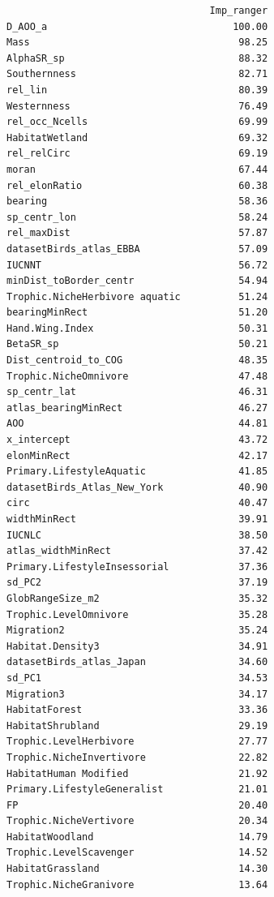\documentclass[
  letterpaper,
  DIV=11,
  numbers=noendperiod]{scrreprt}
\begin{document}
\begin{verbatim}
                                   Imp_ranger
D_AOO_a                                100.00
Mass                                    98.25
AlphaSR_sp                              88.32
Southernness                            82.71
rel_lin                                 80.39
Westernness                             76.49
rel_occ_Ncells                          69.99
HabitatWetland                          69.32
rel_relCirc                             69.19
moran                                   67.44
rel_elonRatio                           60.38
bearing                                 58.36
sp_centr_lon                            58.24
rel_maxDist                             57.87
datasetBirds_atlas_EBBA                 57.09
IUCNNT                                  56.72
minDist_toBorder_centr                  54.94
Trophic.NicheHerbivore aquatic          51.24
bearingMinRect                          51.20
Hand.Wing.Index                         50.31
BetaSR_sp                               50.21
Dist_centroid_to_COG                    48.35
Trophic.NicheOmnivore                   47.48
sp_centr_lat                            46.31
atlas_bearingMinRect                    46.27
AOO                                     44.81
x_intercept                             43.72
elonMinRect                             42.17
Primary.LifestyleAquatic                41.85
datasetBirds_Atlas_New_York             40.90
circ                                    40.47
widthMinRect                            39.91
IUCNLC                                  38.50
atlas_widthMinRect                      37.42
Primary.LifestyleInsessorial            37.36
sd_PC2                                  37.19
GlobRangeSize_m2                        35.32
Trophic.LevelOmnivore                   35.28
Migration2                              35.24
Habitat.Density3                        34.91
datasetBirds_atlas_Japan                34.60
sd_PC1                                  34.53
Migration3                              34.17
HabitatForest                           33.36
HabitatShrubland                        29.19
Trophic.LevelHerbivore                  27.77
Trophic.NicheInvertivore                22.82
HabitatHuman Modified                   21.92
Primary.LifestyleGeneralist             21.01
FP                                      20.40
Trophic.NicheVertivore                  20.34
HabitatWoodland                         14.79
Trophic.LevelScavenger                  14.52
HabitatGrassland                        14.30
Trophic.NicheGranivore                  13.64

\end{verbatim}
\end{document}
